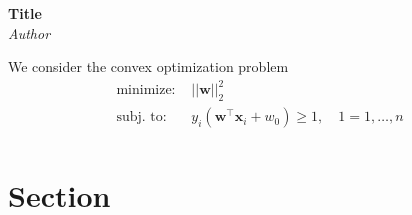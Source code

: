 \documentclass{article}
\newcommand{\1}{\mathbf{1}}
\newcommand{\xx}{\mathbf{x}}
\newcommand{\ww}{\mathbf{w}}
\newcommand{\T}{\top}
\begin{document}
\begin{center}
  \Large\textbf{Title}\\
  \large\textit{Author}
\end{center}
\vspace*{1em}

We consider the convex optimization problem
\begin{align*}
    \text{minimize: } & ||\ww||_2^2\\
    \text{subj. to: } & y_i(\ww^\T\xx_i + w_0) \geq 1,\quad 1=1,\dots,n\\
\end{align*}

\section{Section}
\end{document}
